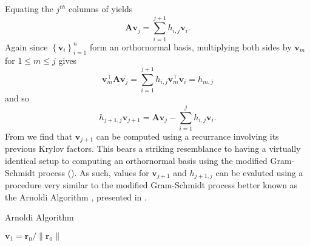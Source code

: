 Equating the $j^{th}$ columns of  yields
\[
    \bm{A} \bm{v}_j = \sum_{i=1}^{j+1} h_{i,j} \bm{v}_{i}.
\]
Again since $\left\{ \bm{v}_i \right\}_{i=1}^{n}$ form an orthornormal basis, multiplying both sides by $\bm{v}_m$ for $1 \leq m \leq j$ gives
\[
    \bm{v}_m^{\intercal} \bm{A} \bm{v}_j = \sum_{i=1}^{j+1} h_{i,j} \bm{v}_m^{\intercal} \bm{v}_{i} = h_{m,j}
\]
and so
\begin{equation}\label{eq: arn_eq_1}
    h_{j+1,j} \bm{v}_{j+1} = \bm{A} \bm{v}_j - \sum_{i=1}^{j} h_{i,j} \bm{v}_{i}.
\end{equation}
From  we find that $\bm{v}_{j+1}$ can be computed using a recurrance involving its previous Krylov factors. This bears a striking resemblance to  having a virtually identical setup to computing an orthornormal basis using the modified Gram-Schmidt process (). As such, values for $\bm{v}_{j+1}$ and $h_{j+1,j}$ can be evaluted using a procedure very similar to the modified Gram-Schmidt process better known as the Arnoldi Algorithm \cite{TrefethenLloydN.LloydNicholas1997Nla/,DemmelJamesW1997Anla}, presented in .

{\centering
\begin{minipage}{.85\linewidth}
    \begin{algorithm}[H]
        \caption{Arnoldi Algorithm}
        \label{alg: Arnoldi_Algorithm}
        \SetAlgoLined
        \DontPrintSemicolon

        \BlankLine
        $\bm{v}_1 = \bm{r}_0 / \| \bm{r}_0 \|$\;
        \BlankLine
    \end{algorithm}
\end{minipage}
\par
}


